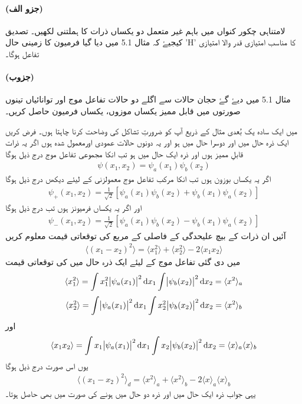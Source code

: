 \paragraph*{(جزو الف)}
لامتناہی چکور کنواں میں باہم غیر متعمل دو یکساں ذرات کا ہملتنی لکھیں۔ تصدیق کیجیۓ کہ مثال 5.1 میں دیا گیا فرمیون کا زمینی حال 'H' کا مناسب امتیازی قدر والا امتیازی تفاعل ہوگا۔ 
\paragraph*{(جزوب)}
مثال 5.1 میں دیۓ گۓ حجان حالات سے اگلے دو حالات تفاعل موج اور توانائیاں تینوں صورتوں میں قابل ممیز یکساں موزوں، یکساں فرمیون حاصل کریں۔


میں ایک سادہ یک بُعدی مثال کے ذریع آپ کو ضرورتِ تشاکل کی وضاحت کرنا چاہتا ہوں۔ فرض کریں ایک ذرہ حال  میں اور دوسرا حال  میں ہو اور یہ دونوں حالات عمودی اورمعمول شدہ ہوں اگر یہ ذرات قابلِ ممیز ہوں اور ذرہ ایک حال  میں ہو تب انکا مجموعی تفاعل موج درج ذیل ہوگا
\begin{align}
	\psi(x_1, x_2)=\psi_a(x_1)\psi_b(x_2)
\end{align}
اگر یہ یکساں بوزون ہوں تب انکا مرکب تفاعل موج  معمولزنی کے لیئے دیکھں درج ذیل ہوگا
\begin{align}
	\psi_+(x_1, x_2) = \frac{1}{\sqrt{2}}[\psi_a(x_1)\psi_b(x_2)+\psi_b(x_1)\psi_a(x_2)]
\end{align}
اور اگر یہ یکساں فرمیونز ہوں تب درج ذیل ہوگا
\begin{align}
	\psi_-(x_1, x_2)=\frac{1}{\sqrt{2}}[\psi_a(x_1)\psi_b(x_2)-\psi_b(x_1)\psi_a(x_2)]
\end{align}
آئیں ان ذرات کے بیچ علیحدگی کے فاصلی کے مربع کی توقعاتی قیمت معلوم کریں
\begin{align}
	\langle(x_1-x_2)^2\rangle=\langle x^2_1\rangle+\langle x_2^2\rangle-2\langle x_1x_2\rangle
\end{align}
  میں دی گئی تفاعل موج کے لیئے ایک ذرہ حال  میں  کی توقعاتی قیمت 
\begin{align*}
	\langle x_1^2\rangle=\int x_1^2\abs{\psi_a(x_1)}^2\dif x_1\int\abs{\psi_b(x_2)}^2\dif x_2=\langle x^2\rangle_a
\end{align*}
\begin{align*}
	\langle x_2^2\rangle=\int\abs{\psi_a(x_1)}^2\dif x_1\int x_2^2\abs{\psi_b(x_2)}^2\dif x_2=\langle x^2\rangle_b
\end{align*}
اور
\begin{align*}
	\langle x_1x_2 \rangle=\int x_1\abs{\psi_a(x_1)}^2\dif x_1\int x_2\abs{\psi_b(x_2)}^2\dif x_2=\langle x\rangle_a\langle x \rangle_b
\end{align*}
یوں اس صورت درج ذیل ہوگا
\begin{align}
	\langle(x_1-x_2)^2\rangle_d=\langle x^2\rangle_a+\langle x^2 \rangle_b-2\langle x \rangle_a\langle x \rangle_b
\end{align}
یہی جواب ذرہ ایک حال  میں اور ذرہ دو حال  میں ہونے کی صورت میں بھی حاصل ہوتا۔

